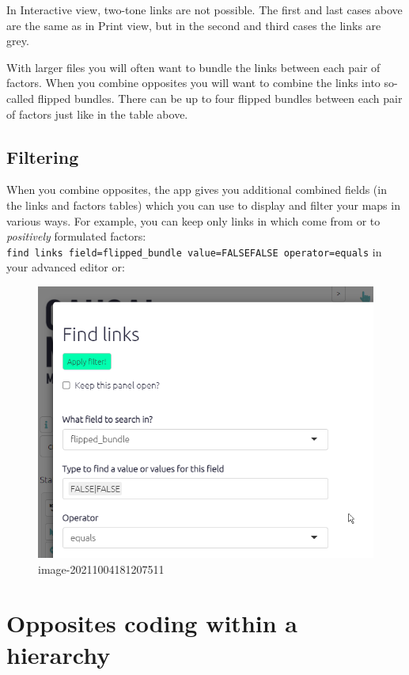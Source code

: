 \documentclass[
]{book}
\begin{document}
In Interactive view, two-tone links are not possible. The first and last cases above are the same as in Print view, but in the second and third cases the links are grey.

With larger files you will often want to bundle the links between each pair of factors. When you combine opposites you will want to combine the links into so-called flipped bundles. There can be up to four flipped bundles between each pair of factors just like in the table above.

\hypertarget{filtering}{%
\subsection{Filtering}\label{filtering}}

When you combine opposites, the app gives you additional combined fields (in the links and factors tables) which you can use to display and filter your maps in various ways. For example, you can keep only links in which come from or to \emph{positively} formulated factors: \texttt{find\ links\ field=flipped\_bundle\ value=FALSE\textbar{}FALSE\ operator=equals} in your advanced editor or:

\begin{figure}
\centering
\includegraphics[width=6.77083in,height=\textheight]{_assets/image-20211004181207511.png}
\caption{image-20211004181207511}
\end{figure}

\hypertarget{xopposites-coding}{%
\section{Opposites coding within a hierarchy}\label{xopposites-coding}}
\end{document}
